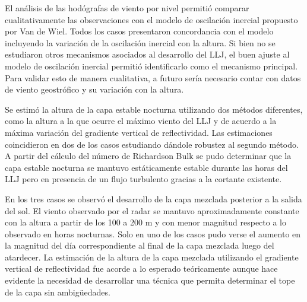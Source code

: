 \documentclass[12pt,spanish,oneside, a4paper]{book}
\begin{document}
El análisis de las hodógrafas de viento por nivel permitió comparar
cualitativamente las observaciones con el modelo de oscilación inercial
propuesto por Van de Wiel. Todos los casos presentaron concordancia con
el modelo incluyendo la variación de la oscilación inercial con la
altura. Si bien no se estudiaron otros mecanismos asociados al
desarrollo del LLJ, el buen ajuste al modelo de oscilación inercial
permitió identificarlo como el mecanismo principal. Para validar esto de
manera cualitativa, a futuro sería necesario contar con datos de viento
geostrófico y su variación con la altura.

Se estimó la altura de la capa estable nocturna utilizando dos métodos
diferentes, como la altura a la que ocurre el máximo viento del LLJ y de
acuerdo a la máxima variación del gradiente vertical de reflectividad.
Las estimaciones coincidieron en dos de los casos estudiando dándole
robustez al segundo método. A partir del cálculo del número de
Richardson Bulk se pudo determinar que la capa estable nocturna se
mantuvo estáticamente estable durante las horas del LLJ pero en
presencia de un flujo turbulento gracias a la cortante existente.

En los tres casos se observó el desarrollo de la capa mezclada posterior
a la salida del sol. El viento observado por el radar se mantuvo
aproximadamente constante con la altura a partir de los 100 a 200 m y
con menor magnitud respecto a lo observado en horas nocturnas. Solo en
uno de los casos pudo verse el aumento en la magnitud del día
correspondiente al final de la capa mezclada luego del atardecer. La
estimación de la altura de la capa mezclada utilizando el gradiente
vertical de reflectividad fue acorde a lo esperado teóricamente aunque
hace evidente la necesidad de desarrollar una técnica que permita
determinar el tope de la capa sin ambigüedades.
\end{document}

